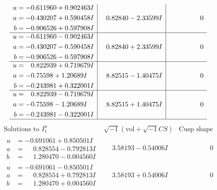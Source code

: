 \documentclass[1p]{elsarticle_modified}
\theoremstyle{definition}
\newcommand{\I}{\sqrt{-1}}
\begin{document}
$$\begin{array}{c|c|c}
\begin{aligned}
u &= -0.611960 + 0.902463 I \\
a &= -0.430207 + 0.590458 I \\
b &= -0.906526 + 0.597908 I\end{aligned}
 & \phantom{-}0.82840 - 2.33599 I & \phantom{-0.000000 } 0 \\ \hline\begin{aligned}
u &= -0.611960 - 0.902463 I \\
a &= -0.430207 - 0.590458 I \\
b &= -0.906526 - 0.597908 I\end{aligned}
 & \phantom{-}0.82840 + 2.33599 I & \phantom{-0.000000 } 0 \\ \hline\begin{aligned}
u &= \phantom{-}0.822939 + 0.719679 I \\
a &= -0.75598 + 1.20689 I \\
b &= -0.243981 + 0.322001 I\end{aligned}
 & \phantom{-}8.82515 - 1.40475 I & \phantom{-0.000000 } 0 \\ \hline\begin{aligned}
u &= \phantom{-}0.822939 - 0.719679 I \\
a &= -0.75598 - 1.20689 I \\
b &= -0.243981 - 0.322001 I\end{aligned}
 & \phantom{-}8.82515 + 1.40475 I & \phantom{-0.000000 } 0\\
 \hline 
 \end{array}$$\newpage$$\begin{array}{c|c|c}  
\text{Solutions to }I^u_{1}& \I (\text{vol} + \sqrt{-1}CS) & \text{Cusp shape}\\
 \hline 
\begin{aligned}
u &= -0.691061 + 0.850501 I \\
a &= \phantom{-}0.828554 - 0.792813 I \\
b &= \phantom{-}1.280470 - 0.004560 I\end{aligned}
 & \phantom{-}3.58193 - 0.54006 I & \phantom{-0.000000 } 0 \\ \hline\begin{aligned}
u &= -0.691061 - 0.850501 I \\
a &= \phantom{-}0.828554 + 0.792813 I \\
b &= \phantom{-}1.280470 + 0.004560 I\end{aligned}
 & \phantom{-}3.58193 + 0.54006 I & \phantom{-0.000000 } 0 \\ \hline\begin{aligned}

\end{aligned}
\end{array}$$
\end{document}
